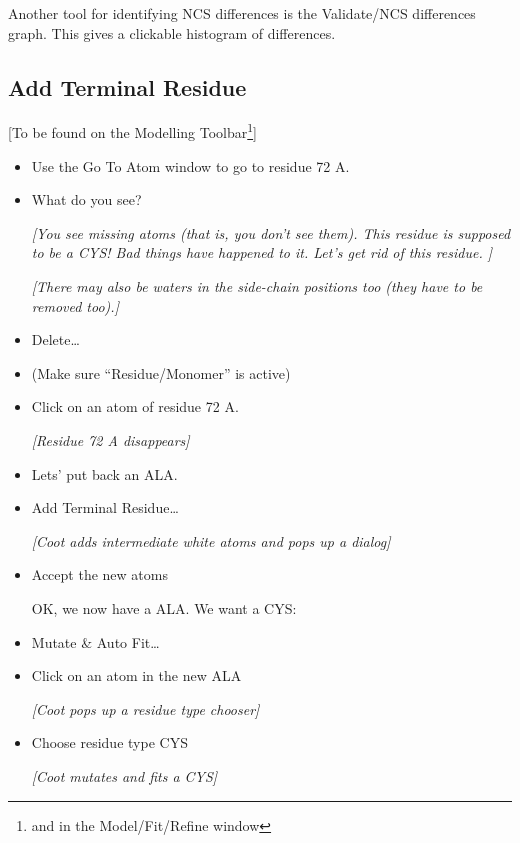 \documentclass{article}
\begin{document}
Another tool for identifying NCS differences is the
\textsf{Validate/NCS differences} graph. This gives a clickable
histogram of differences.


\subsection{Add Terminal Residue}
[To be found on the Modelling Toolbar\footnote{and in the 
  Model/Fit/Refine window}]

\begin{itemize}
\item Use the Go To Atom window to go to residue 72 A.

\item What do you see?
  
  \emph{[You see missing atoms (that is, you don't see them).  This residue
  is supposed to be a CYS!  Bad things have happened to it.  Let's get
  rid of this residue. ]}
  
  \emph{[There may also be waters in the side-chain positions too (they have
  to be removed too).]} 

\item \textsf{Delete\ldots}

\item (Make sure ``Residue/Monomer'' is active)

\item Click on an atom of residue 72 A.

\textsl{  [Residue 72 A disappears]}

\item Lets' put back an ALA.

\item \textsf{Add Terminal Residue\ldots}

\textsl{  [Coot adds intermediate white atoms and pops up a dialog]}

\item \textsf{Accept} the new atoms

OK, we now have a ALA.  We want a CYS:

\item \textsf{Mutate \& Auto Fit\ldots}

\item Click on an atom in the new ALA

\textsl{  [Coot pops up a residue type chooser]}

\item Choose residue type \textsf{CYS}

\textsl{  [Coot mutates and fits a CYS]}


\end{itemize}
\end{document}
